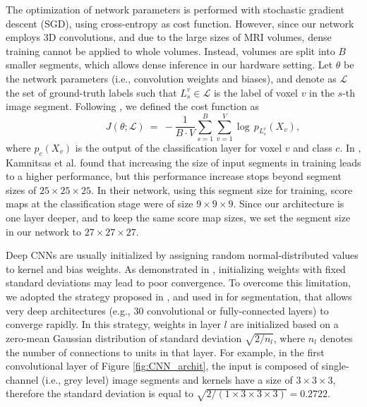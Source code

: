 \documentclass[twoside,fleqn,espcrc2]{elsarticle}
\newcommand{\vold}[1]{$#1\!\times\!#1\!\times\!#1$}
\begin{document}
The optimization of network parameters is performed with stochastic gradient descent (SGD), using cross-entropy as cost function. However, since our network employs 3D convolutions, and due to the large sizes of MRI volumes, dense training cannot be applied to whole volumes. Instead, volumes are split into $B$ smaller segments, which allows dense inference in our hardware setting. Let $\theta$ be the network parameters (i.e., convolution weights and biases), and denote as $\mathcal{L}$ the set of ground-truth labels such that $L^v_s \in \mathcal{L}$ is the label of voxel $v$ in the $s$-th image segment. Following \cite{kamnitsas2016efficient}, we defined the cost function as
\begin{equation}
\qquad \qquad  J(\theta; \mathcal{L}) \ = \
    -\frac{1}{B\!\cdot\!V} \sum^{B}_{s=1} \sum^{V}_{v=1} \log \, p_{L^v_s}(X_v),
\end{equation}
where $p_c(X_v)$ is the output of the classification layer for voxel $v$ and class $c$. In \cite{kamnitsas2016efficient}, Kamnitsas et al. found that increasing the size of input segments in training leads to a higher performance, but this performance increase stops beyond segment sizes of \vold{25}. In their network, using this segment size for training, score maps at the classification stage were of size \vold{9}. Since our architecture is one layer deeper, and to keep the same score map sizes, we set the segment size in our network to \vold{27}.


Deep CNNs are usually initialized by assigning random normal-distributed values to kernel and bias weights. As demonstrated in \cite{simonyan2014very}, initializing weights with fixed standard deviations may lead to poor convergence. To overcome this limitation, we adopted the strategy proposed in \cite{he2015delving}, and used in \cite{kamnitsas2016efficient} for segmentation, that allows very deep architectures (e.g., 30 convolutional or fully-connected layers) to converge rapidly. In this strategy, weights in layer $l$ are initialized based on a zero-mean Gaussian distribution of standard deviation  $\sqrt{2/n_l}$, where $n_l$ denotes the number of connections to units in that layer. For example, in the first convolutional layer of Figure \ref{fig:CNN_archit}, the input is composed of single-channel (i.e., grey level) image segments and kernels have a size of \vold{3}, therefore the standard deviation is equal to $\sqrt{2/(1\times3\times3\times3)} = 0.2722$.
\end{document}
